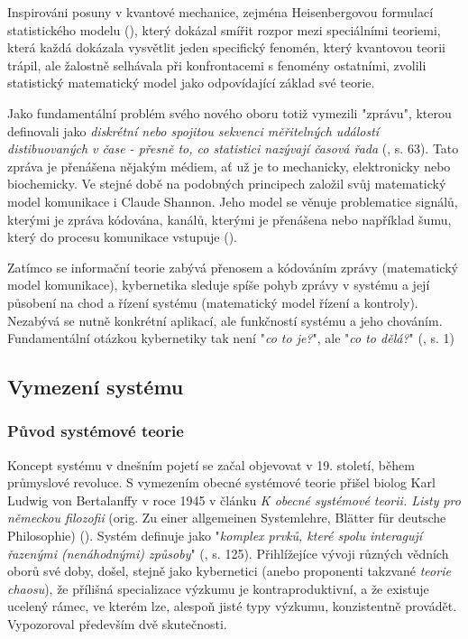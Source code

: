 \documentclass[11pt,a4paper]{article}
\begin{document}
Inspirováni posuny v kvantové mechanice, zejména Heisenbergovou formulací statistického modelu (\cite{heisenberg_uber_1925, waerden_sources_1968}), který dokázal smířit rozpor mezi speciálními teoriemi, která každá dokázala vysvětlit jeden specifický fenomén, který kvantovou teorii trápil, ale žalostně selhávala při konfrontacemi s fenomény ostatními, zvolili statistický matematický model jako odpovídající základ své teorie. 

Jako fundamentální problém svého nového oboru totiž vymezili "zprávu", kterou definovali jako \textit{diskrétní nebo spojitou sekvenci měřitelných událostí distibuovaných v čase - přesně to, co statistici nazývají časová řada} (\cite{wiener_cybernetics_2019}, s. 63). Tato zpráva je přenášena nějakým médiem, ať už je to mechanicky, elektronicky nebo biochemicky. Ve stejné době na podobných principech založil svůj matematický model komunikace i Claude Shannon. Jeho model se věnuje problematice signálů, kterými je zpráva kódována, kanálů, kterými je přenášena nebo například šumu, který do procesu komunikace vstupuje (\cite{shannon_mathematical_1998}).

Zatímco se informační teorie zabývá přenosem a kódováním zprávy (matematický model komunikace), kybernetika sleduje spíše pohyb zprávy v systému a její působení na chod a řízení systému (matematický model řízení a kontroly). Nezabývá se nutně konkrétní aplikací, ale funkčností systému a jeho chováním. Fundamentální otázkou kybernetiky tak není "\textit{co to je?}", ale "\textit{co to dělá?}" (\cite{ashby_introduction_2015}, s. 1) 


\subsection{Vymezení systému}

\subsubsection{Původ systémové teorie}

Koncept systému v dnešním pojetí se začal objevovat v 19. století, během průmyslové revoluce. S vymezením obecné systémové teorie přišel biolog Karl Ludwig von Bertalanffy v roce 1945 v článku \textit{K obecné systémové teorii. Listy pro německou filozofii} (orig. Zu einer allgemeinen Systemlehre, Blätter für deutsche Philosophie) (\cite*{bleicher_zu_1972}). Systém definuje jako "\textit{komplex prvků, které spolu interagují řazenými (nenáhodnými) způsoby}" (\cite{von_bertalanffy_general_1967}, s. 125). Přihlížejíce vývoji různých vědních oborů své doby, došel, stejně jako kybernetici (anebo proponenti takzvané \textit{teorie chaosu}), že přílišná specializace výzkumu je kontraproduktivní, a že existuje ucelený rámec, ve kterém lze, alespoň jisté typy výzkumu, konzistentně provádět. Vypozoroval především dvě skutečnosti. 
\end{document}
